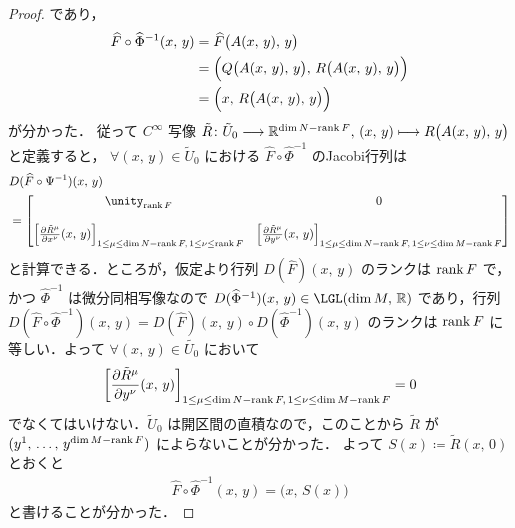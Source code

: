 \documentclass[TQFT_main]{subfiles}
\begin{document}
\begin{proof}
    であり，
    \begin{align}
        \widehat{F} \circ \widehat{\Phi}^{-1} (x,\, y)
        &= \widehat{F} \bigl( A(x,\, y),\, y \bigr)  \\
        &= \Bigl( Q \bigl( A(x,\, y),\, y \bigr),\,  R \bigl( A(x,\, y),\, y \bigr)  \Bigr) \\
        &= \Bigl( x,\,  R \bigl( A(x,\, y),\, y \bigr)  \Bigr)
    \end{align}
    が分かった．
    従って $C^\infty$ 写像 $\tilde{R} \colon \tilde{U}_0 \longrightarrow \mathbb{R}^{\dim N -\rank F},\, (x,\, y) \longmapsto R \bigl( A(x,\, y),\, y \bigr)$ と定義すると，
    $\forall (x,\, y) \in \tilde{U}_0$ における $\widehat{F} \circ \widehat{\Phi}^{-1}$ のJacobi行列は
    \begin{align}
        &D (\widehat{F} \circ \Psi^{-1}) (x,\, y) \\
        &= 
        \mqty[
            \unity_{\rank F} & 0 \\
            & \\
            \left[\pdv{\tilde{R}^\mu}{x^\nu}()(x,\, y)\right]_{1 \le \mu \le \dim N - \rank F,\, 1 \le \nu \le \rank F} & \left[\pdv{\tilde{R}^\mu}{y^\nu}()(x,\, y)\right]_{1 \le \mu \le \dim N - \rank F,\, 1 \le \nu \le \dim M - \rank F} \\ 
        ]
    \end{align}
    と計算できる．ところが，仮定より行列 $D(\widehat{F})(x,\, y)$ のランクは $\rank F$ で，かつ $\widehat{\Phi}^{-1}$ は微分同相写像なので $D(\widehat{\Phi}^{-1})(x,\, y) \in \LGL(\dim M,\, \mathbb{R})$ であり，行列 $D (\widehat{F} \circ \widehat{\Phi}^{-1})(x,\, y) = D(\widehat{F})(x,\, y) \circ D(\widehat{\Phi}^{-1})(x,\, y)$ のランクは $\rank F$ に等しい．よって $\forall (x,\, y) \in \tilde{U_0}$ において
    \begin{align}
        \left[\pdv{\tilde{R}^\mu}{y^\nu}()(x,\, y)\right]_{1 \le \mu \le \dim N - \rank F,\, 1 \le \nu \le \dim M - \rank F} = 0
    \end{align}
    でなくてはいけない．$\tilde{U}_0$ は開区間の直積なので，このことから $\tilde{R}$ が $(y^1,\, \dots,\, y^{\dim M - \rank F})$ によらないことが分かった．
    よって $S(x) \coloneqq \tilde{R}(x,\, 0)$ とおくと
    \begin{align}
        \label{eq:thm-rank-1}
        \widehat{F} \circ \widehat{\Phi}^{-1}(x,\, y) = \bigl( x,\, S(x) \bigr) 
    \end{align}
    と書けることが分かった．


\end{proof}
\end{document}
